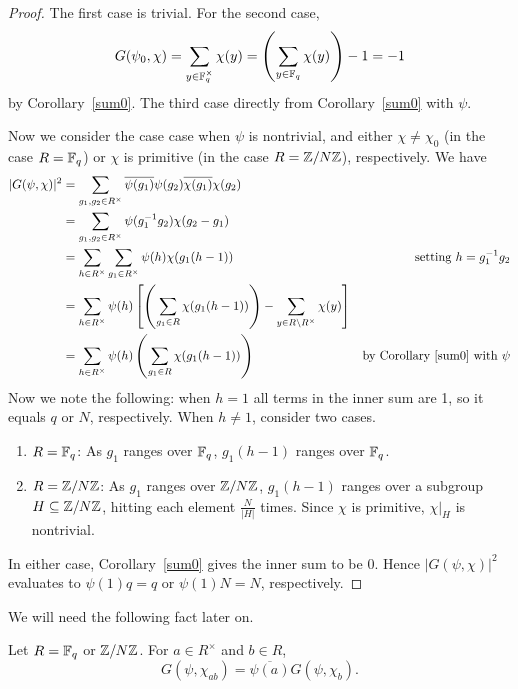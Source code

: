 \begin{proof}
The first case is trivial. For the second case,
\[
G(\psi_0,\chi)=\sum_{y\in \mathbb{F}_q^{\times}}\chi(y)=\left( { \sum_{y\in \mathbb{F}_q} \chi(y)} \right)-1=-1
\]
by Corollary~\ref{sum0}. The third case directly from Corollary~\ref{sum0} with $\psi$. 

Now we consider the case case when $\psi$ is nontrivial, and either $\chi\ne \chi_0$ (in the case $R=\mathbb{F}_q$) or $\chi$ is primitive (in the case $R=\mathbb{Z}/N\mathbb{Z}$), respectively. We have
\begin{align*}
|G(\psi,\chi)|^2&=\sum_{g_1,g_2\in R^{\times}}
\overline{\psi(g_1)}\psi(g_2)\overline{\chi(g_1)}\chi(g_2)\\
&=\sum_{g_1,g_2\in R^{\times}}\psi(g_1^{-1}g_2)\chi(g_2-g_1)\\
&=\sum_{h\in R^{\times}} \sum_{g_1\in R^{\times}}\psi(h)\chi(g_1(h-1))&\text{setting }h=g_1^{-1}g_2\\
&=\sum_{h\in R^{\times}} \psi(h)\ba{\pa{\sum_{g_1\in R}\chi(g_1(h-1))}-\sum_{y\in R\bs R^{\times}} \chi(y)}\\
&=\sum_{h\in R^{\times}} \psi(h)\pa{\sum_{g_1\in R}\chi(g_1(h-1))}&\text{by Corollary \ref{sum0} with }\psi%
\end{align*}
Now we note the following: when $h=1$ all terms in the inner sum are 1, so it equals $q$ or $N$, respectively. When $h\ne 1$, consider two cases.
\begin{enumerate}
\item
$R=\mathbb{F}_q$: As $g_1$ ranges over $\mathbb{F}_q$, $g_1(h-1)$ ranges over $\mathbb{F}_q$.
\item
$R=\mathbb{Z}/N\mathbb{Z}$: As $g_1$ ranges over $\mathbb{Z}/N\mathbb{Z}$, $g_1(h-1)$ ranges over a subgroup $H\subseteq \mathbb{Z}/N\mathbb{Z}$, hitting each element $\frac{N}{|H|}$ times. Since $\chi$ is primitive, $\chi|_H$ is nontrivial.
\end{enumerate}
In either case, Corollary~\ref{sum0} gives the inner sum to be 0. Hence $|G(\psi,\chi)|^2$ evaluates to $\psi(1)q=q$ or $\psi(1)N=N$, respectively.
\end{proof}
We will need the following fact later on.
\begin{pr}
Let $R=\mathbb{F}_q$ or $\mathbb{Z}/N\mathbb{Z}$. 
For $a\in R^{\times}$ and $b\in R$,
\[G(\psi,\chi_{ab})=\overline{\psi(a)}G(\psi,\chi_b).\]
\end{pr}
